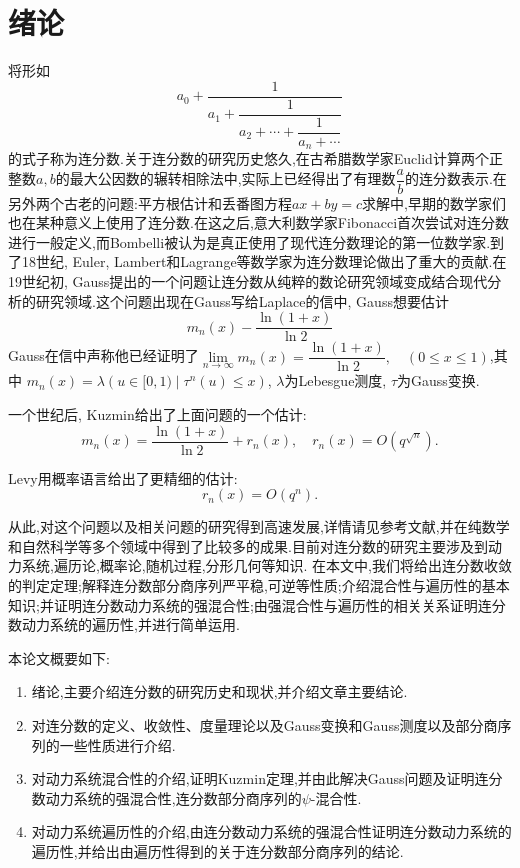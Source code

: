 \seccontent
\section{绪论}
\hspace{12em}

将形如
\begin{equation}\label{definition}
a_0+\frac{1}{a_1+\dfrac{1}{a_2+\cdots+\dfrac{1}{a_n+\cdots}}}
\end{equation}
的式子称为连分数.关于连分数的研究历史悠久,在古希腊数学家Euclid计算两个正整数$a,b$的最大公因数的辗转相除法中,实际上已经得出了有理数$\dfrac{a}{b}$的连分数表示.在另外两个古老的问题:平方根估计和丢番图方程$ax+by=c$求解中,早期的数学家们也在某种意义上使用了连分数.在这之后,意大利数学家Fibonacci首次尝试对连分数进行一般定义,而Bombelli被认为是真正使用了现代连分数理论的第一位数学家.到了18世纪, Euler, Lambert和Lagrange等数学家为连分数理论做出了重大的贡献.在19世纪初, Gauss提出的一个问题让连分数从纯粹的数论研究领域变成结合现代分析的研究领域.这个问题出现在Gauss写给Laplace的信中, Gauss想要估计
$$m_n(x)-\frac{\ln(1+x)}{\ln{2}}$$
Gauss在信中声称他已经证明了$\lim\limits_{n\to\infty}m_n(x)=\dfrac{\ln(1+x)}{\ln{2}},\quad(0\leqslant x\leqslant 1)$,其中
$m_n(x)=\lambda({u\in[0,1)\mid\tau^n(u)\leqslant x})$, $\lambda$为Lebesgue测度, $\tau$为Gauss变换.\par
一个世纪后, Kuzmin给出了上面问题的一个估计\textsuperscript{\cite{Kuzmin}}:
$$m_n\left(x\right)=\frac{\ln{\left(1+x\right)}}{\ln{2}}+r_n\left(x\right),\quad r_n\left(x\right)=O\left(q^{\sqrt n}\right).$$\par
Levy用概率语言给出了更精细的估计\textsuperscript{\cite{Iosifescu,Levy}}:
$$r_n(x)=O(q^n).$$\par
从此,对这个问题以及相关问题的研究得到高速发展,详情请见参考文献\cite{Liu_Peng,The_long_history,Iosifescu,Gauss-Kuzmin_type,Zhang_Xian,Random_variables,Dimensional_theory,Zhang_Mengjie,Xie_Shenghan,Geng_Xianjin},并在纯数学和自然科学等多个领域中得到了比较多的成果.目前对连分数的研究主要涉及到动力系统,遍历论,概率论,随机过程,分形几何等知识.
在本文中,我们将给出连分数收敛的判定定理;解释连分数部分商序列严平稳,可逆等性质;介绍混合性与遍历性的基本知识;并证明连分数动力系统的强混合性;由强混合性与遍历性的相关关系证明连分数动力系统的遍历性,并进行简单运用.\par
本论文概要如下:
\begin{enumerate}
      \item 绪论,主要介绍连分数的研究历史和现状,并介绍文章主要结论.
      \item 对连分数的定义、收敛性、度量理论以及Gauss变换和Gauss测度以及部分商序列的一些性质进行介绍.
      \item 对动力系统混合性的介绍,证明Kuzmin定理,并由此解决Gauss问题及证明连分数动力系统的强混合性,连分数部分商序列的$\psi$-混合性.
      \item 对动力系统遍历性的介绍,由连分数动力系统的强混合性证明连分数动力系统的遍历性,并给出由遍历性得到的关于连分数部分商序列的结论.
\end{enumerate}

\sectionbreak